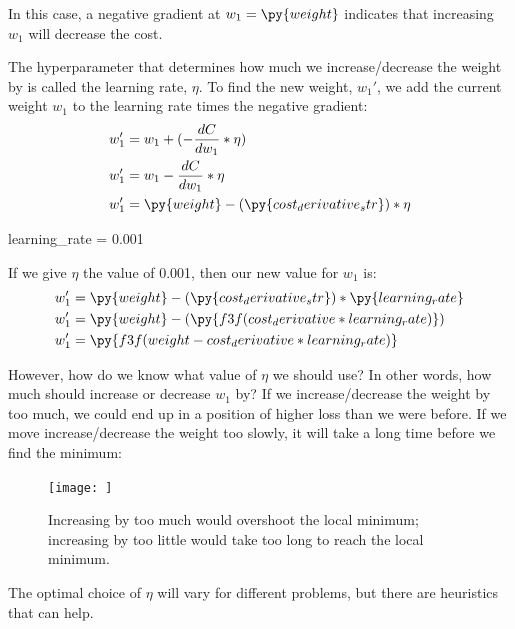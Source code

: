 \documentclass[12pt, demo]{article}
\begin{document}
In this case, a negative gradient at $w_1 = \py{weight}$ indicates that increasing $w_1$ will decrease the cost.

The hyperparameter that determines how much we increase/decrease the weight by is called the learning rate, $\eta$. To find the new weight, $w_1'$, we add the current weight $w_1$ to the learning rate times the negative gradient:
\begin{align*}
	w_1' & = w_1 + (-\frac{dC}{dw_1} * \eta)
	\\
	w_1' & = w_1 - \frac{dC}{dw_1} * \eta
	\\
	w_1' & = \py{weight} - (\py{cost_derivative_str}) * \eta
\end{align*}

\begin{pycode}
learning_rate = 0.001
\end{pycode}

If we give $\eta$ the value of 0.001, then our new value for $w_1$ is:
\begin{align*}
	w_1' & = \py{weight} - (\py{cost_derivative_str}) * \py{learning_rate}
	\\
	w_1' & = \py{weight} - (\py{f3f(cost_derivative * learning_rate)})
	\\
	w_1' & = \py{f3f(weight - cost_derivative * learning_rate)}
\end{align*}

However, how do we know what value of $\eta$ we should use? In other words, how much should increase or decrease $w_1$ by? If we increase/decrease the weight by too much, we could end up in a position of higher loss than we were before. If we move increase/decrease the weight too slowly, it will take a long time before we find the minimum:

\begin{figure}[hbt!]
	\caption{Increasing by too much would overshoot the local minimum; increasing by too little would take too long to reach the local minimum.}
	\texttt{[image: ]}
\end{figure}

The optimal choice of $\eta$ will vary for different problems, but there are heuristics that can help.
\end{document}
